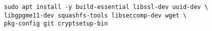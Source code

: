 
\begin{issues}
\issueDraft
\end{issues}

\begin{lstlisting}[language=none]
sudo apt install -y build-essential libssl-dev uuid-dev \
libgpgme11-dev squashfs-tools libseccomp-dev wget \
pkg-config git cryptsetup-bin
\end{lstlisting}
